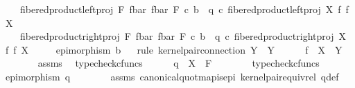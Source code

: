 \begin{isabellebody}
\ \ \ \ fibered{\isacharunderscore}{\kern0pt}product{\isacharunderscore}{\kern0pt}left{\isacharunderscore}{\kern0pt}proj\ F\ {\isacharparenleft}{\kern0pt}f{\isacharunderscore}{\kern0pt}bar{\isacharparenright}{\kern0pt}\ {\isacharparenleft}{\kern0pt}f{\isacharunderscore}{\kern0pt}bar{\isacharparenright}{\kern0pt}\ F\ {\isasymcirc}\isactrlsub c\ b\ {\isacharequal}{\kern0pt}\ q\ {\isasymcirc}\isactrlsub c\ fibered{\isacharunderscore}{\kern0pt}product{\isacharunderscore}{\kern0pt}left{\isacharunderscore}{\kern0pt}proj\ X\ f\ f\ X\ {\isasymand}\isanewline
\ \ \ \ fibered{\isacharunderscore}{\kern0pt}product{\isacharunderscore}{\kern0pt}right{\isacharunderscore}{\kern0pt}proj\ F\ {\isacharparenleft}{\kern0pt}f{\isacharunderscore}{\kern0pt}bar{\isacharparenright}{\kern0pt}\ {\isacharparenleft}{\kern0pt}f{\isacharunderscore}{\kern0pt}bar{\isacharparenright}{\kern0pt}\ F\ {\isasymcirc}\isactrlsub c\ b\ {\isacharequal}{\kern0pt}\ q\ {\isasymcirc}\isactrlsub c\ fibered{\isacharunderscore}{\kern0pt}product{\isacharunderscore}{\kern0pt}right{\isacharunderscore}{\kern0pt}proj\ X\ f\ f\ X\ {\isasymand}\isanewline
\ \ \ \ epimorphism\ b{\isachardoublequoteclose}\isanewline
\ \ \isamarkupfalse%
{\isacharparenleft}{\kern0pt}rule\ kernel{\isacharunderscore}{\kern0pt}pair{\isacharunderscore}{\kern0pt}connection{\isacharbrackleft}{\kern0pt}\ Y\ {\isacharequal}{\kern0pt}\ Y{\isacharbrackright}{\kern0pt}{\isacharparenright}{\kern0pt}\isanewline
\ \ \ \ \isamarkupfalse%
\ {\isachardoublequoteopen}f\ {\isacharcolon}{\kern0pt}\ X\ {\isasymrightarrow}\ Y{\isachardoublequoteclose}\isanewline
\ \ \ \ \ \ \isamarkupfalse%
\ assms\ \isamarkupfalse%
\ typecheck{\isacharunderscore}{\kern0pt}cfuncs\isanewline
\ \ \ \ \isamarkupfalse%
\ {\isachardoublequoteopen}q\ {\isacharcolon}{\kern0pt}\ X\ {\isasymrightarrow}\ F{\isachardoublequoteclose}\isanewline
\ \ \ \ \ \ \isamarkupfalse%
\ typecheck{\isacharunderscore}{\kern0pt}cfuncs\isanewline
\ \ \ \ \isamarkupfalse%
\ {\isachardoublequoteopen}epimorphism\ q{\isachardoublequoteclose}\isanewline
\ \ \ \ \ \ \isamarkupfalse%
\ assms{\isacharparenleft}{\kern0pt}{}{\isacharparenright}{\kern0pt}\ canonical{\isacharunderscore}{\kern0pt}quot{\isacharunderscore}{\kern0pt}map{\isacharunderscore}{\kern0pt}is{\isacharunderscore}{\kern0pt}epi\ kernel{\isacharunderscore}{\kern0pt}pair{\isacharunderscore}{\kern0pt}equiv{\isacharunderscore}{\kern0pt}rel\ q{\isacharunderscore}{\kern0pt}def\ \isamarkupfalse%

\end{isabellebody}
